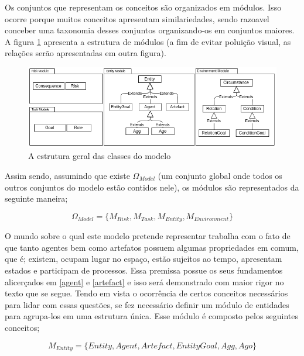 Os conjuntos que representam os conceitos são organizados em  módulos. Isso ocorre porque muitos conceitos apresentam similariedades, sendo razoavel conceber uma taxonomia desses conjuntos organizando-os em conjuntos maiores. A figura \ref{module} apresenta a estrutura de módulos (a fim de evitar poluição visual, as relações serão apresentadas em outra figura). 

\begin{figure}[H]
  \centering
  \includegraphics[width=1\linewidth]{figure/Module.png} 
  \caption{A estrutura geral das classes do modelo}
  \label{module}
\end{figure}

Assim sendo, assumindo que existe $\Omega_{Model}$ (um conjunto global onde todos os outros conjuntos do modelo estão contidos nele), os módulos são representados da seguinte maneira; 

\begin{equation} 
    \Omega_{Model} = \{ M_{Risk}, M_{Task}, M_{Entity}, M_{Environment}\}
\end{equation}
\label{modules}


O mundo sobre o qual este modelo pretende representar trabalha com o fato de que tanto agentes bem como artefatos possuem algumas propriedades em comum, que é; existem, ocupam lugar no espaço, estão sujeitos ao tempo, apresentam estados e participam de processos. Essa premissa possue os seus fundamentos alicerçados em \ref{agent} e \ref{artefact} e isso será demonstrado com maior rigor no texto que se segue. Tendo em vista o ocorrência de certos conceitos necessários para lidar com essas questões, se fez necessário definir um módulo de entidades para agrupa-los em uma estrutura única. Esse módulo é composto pelos seguintes conceitos;

\begin{equation} 
M_{Entity} = \{ Entity, Agent, Artefact, EntityGoal, Agg, Ago\}
\end{equation}\label{modent}

